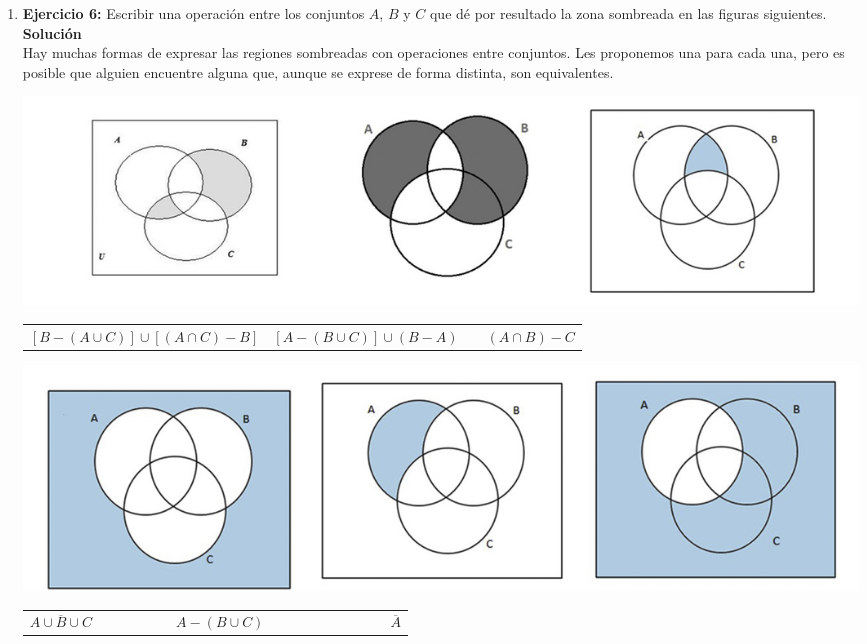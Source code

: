 \documentclass[12pt]{article}
\theoremstyle{definition}
\begin{document}
\begin{enumerate}
\item\textbf{Ejercicio 6:}  Escribir una operación entre los conjuntos $A$, $B$ y $C$ que dé por resultado la zona sombreada en las figuras siguientes.\\
\textbf{Solución} \\
Hay muchas formas de expresar las regiones sombreadas con operaciones entre conjuntos. Les proponemos una para cada una, pero es posible que alguien encuentre alguna que, aunque se exprese de forma distinta, son equivalentes.
 \begin{center} 
\includegraphics[width=1\textwidth]{tp_1_sol_f3.jpg} 
\end{center}

\begin{table}[H]
\begin{center} 
\begin{tabular} { c c c c }
$\left[ B- (A\cup C) \right] \cup \left[(A \cap C) - B \right]$ & $\left[ A - (B \cup C) \right] \cup (B-A)$ &&  $(A \cap B) - C$
  \end{tabular} 
\end{center} 
\end{table}
 
\begin{center} 
\includegraphics[width=1\textwidth]{tp_1_sol_f4.jpg} 
\end{center}

\begin{table}[H]
\begin{center} 
\begin{tabular} { c c c c c c c c c c c c c c c c }
$ \overline { A \cup B \cup C }$ &&&&& &  $A - (B \cup C)$ & & &&&&&& &  $\overline {A}$
  \end{tabular} 
\end{center} 
\end{table}
 

\end{enumerate}
\end{document}
